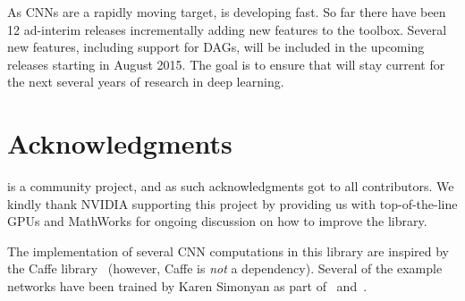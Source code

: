 As CNNs are a rapidly moving target, \matconvnet is developing fast. So far there have been  12 ad-interim releases incrementally adding new features to the toolbox. Several new features, including support for DAGs, will be included in the upcoming releases starting in August 2015.  The goal is to ensure that \matconvnet will stay current for the next several years of research in deep learning.

\section{Acknowledgments}\label{s:ack}

\matconvnet is a community project, and as such acknowledgments got to all contributors. We kindly thank NVIDIA supporting this project by providing us with top-of-the-line GPUs and MathWorks for ongoing discussion on how to improve the library. 

The implementation of several CNN computations in this library are inspired by the Caffe library~\cite{jia13caffe} (however, Caffe is \emph{not} a dependency). Several of the example networks have been trained by Karen Simonyan as part of~\cite{chatfield14return} and~\cite{simonyan15very}.
